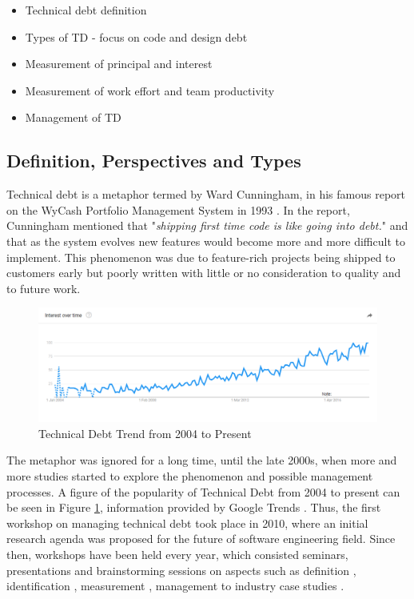 \documentclass{mprop}
\begin{document}
\begin{itemize}
	\item Technical debt definition
	\item Types of TD - focus on code and design debt
	\item Measurement of principal and interest
	\item Measurement of work effort and team productivity
	\item Management of TD
\end{itemize}

\subsection{Definition, Perspectives and Types}
\label{section:def}

Technical debt is a metaphor termed by Ward Cunningham, in his famous report on
the WyCash Portfolio Management System in 1993 \cite{Cunningham1993}. In the
report, Cunningham mentioned that "\textit{shipping first time code is like
	going into debt.}" and that as the system evolves new features would become more
and more difficult to implement. This phenomenon was due to feature-rich
projects being shipped to customers early but poorly written with little or no
consideration to quality and to future work.

\begin{figure}
	\centering
	\includegraphics[width=\linewidth]{visualisations/TD_trend.png}
	\caption{Technical Debt Trend from 2004 to Present}
	\label{fig:td-trend}
\end{figure}

The metaphor was ignored for a long time, until the late 2000s, when more and
more studies started to explore the phenomenon and possible management
processes. A figure of the popularity of Technical Debt from 2004 to present can
be seen in Figure \ref{fig:td-trend}, information provided by Google Trends
\cite{GoogleTrends}. Thus, the first workshop on managing technical debt took
place in 2010, where an initial research agenda was proposed for the future of
software engineering field. Since then, workshops have been held every year,
which consisted seminars, presentations and brainstorming sessions on aspects
such as definition \cite{Kruchten2012} \cite{Theodoropoulos2011}
\cite{Schmid2013}, identification \cite{Ernst2012}, measurement
\cite{Letouzey2012} \cite{Curtis2012} \cite{Nugroho2011} \cite{Zazworka2011}
\cite{Fontana2012} \cite{Bohnet2011}, management \cite{Guo2011}
\cite{Zazworka2011Prioritise} \cite{Seaman2012} to industry case studies
\cite{Lim2012} \cite{Morgenthaler2012} \cite{Codabux2013} \cite{Holvitie2014}
\cite{Klinger2011}.
\end{document}
